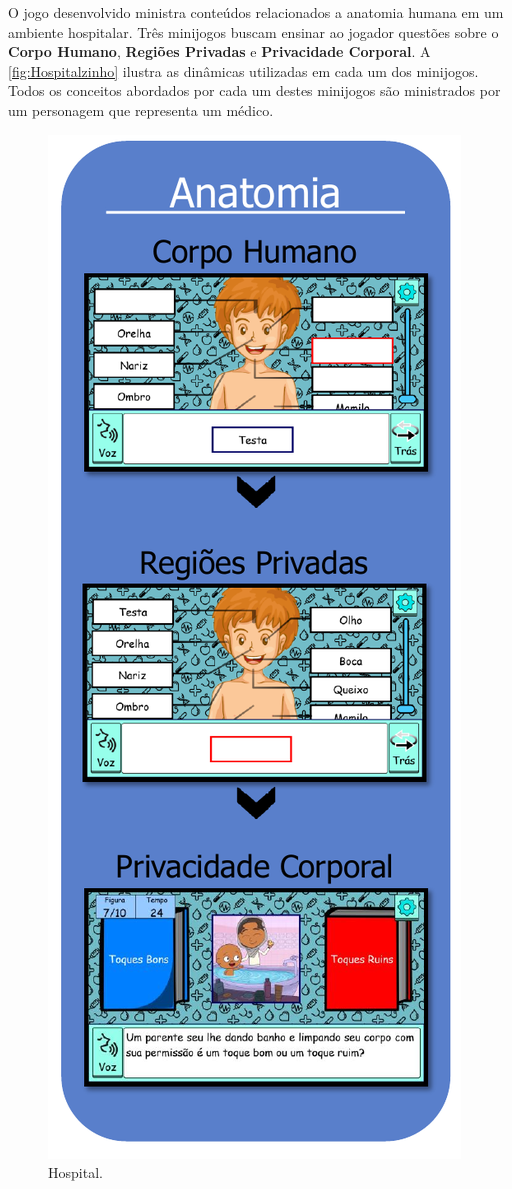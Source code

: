O jogo desenvolvido ministra conteúdos relacionados a anatomia humana em um ambiente hospitalar. Três minijogos buscam ensinar ao jogador questões sobre o \textbf{Corpo Humano}, \textbf{Regiões Privadas} e \textbf{Privacidade Corporal}. A \autoref{fig:Hospitalzinho} ilustra as dinâmicas utilizadas em cada um dos minijogos. Todos os conceitos abordados por cada um destes minijogos são ministrados por um personagem que representa um médico. 

\begin{figure}%
  \vspace{-20pt}
  \caption{\label{fig:Hospitalzinho}Hospital.}
  \includegraphics[width=\linewidth]{./Visuais/Hospital2.pdf}

\end{figure}
